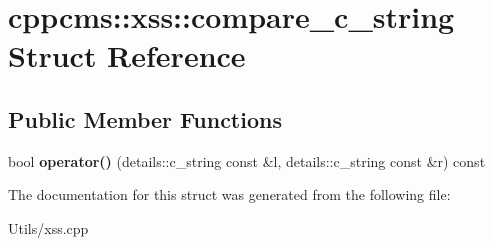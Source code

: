 \hypertarget{structcppcms_1_1xss_1_1compare__c__string}{\section{cppcms\-:\-:xss\-:\-:compare\-\_\-c\-\_\-string Struct Reference}
\label{structcppcms_1_1xss_1_1compare__c__string}
}
\subsection*{Public Member Functions}
\begin{DoxyCompactItemize}
\item 
\hypertarget{structcppcms_1_1xss_1_1compare__c__string_a356ebdaf96d9177a9cf7eb318ec8ffb5}{bool {\bfseries operator()} (details\-::c\-\_\-string const \&l, details\-::c\-\_\-string const \&r) const }\label{structcppcms_1_1xss_1_1compare__c__string_a356ebdaf96d9177a9cf7eb318ec8ffb5}

\end{DoxyCompactItemize}


The documentation for this struct was generated from the following file\-:\begin{DoxyCompactItemize}
\item 
Utils/xss.\-cpp\end{DoxyCompactItemize}
